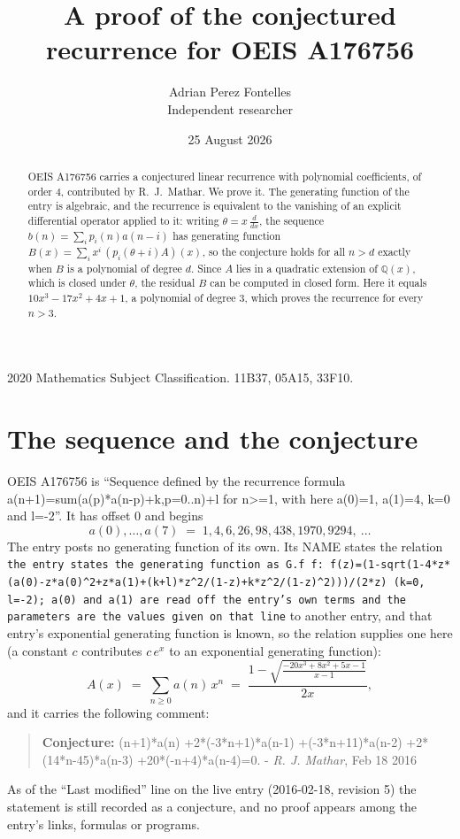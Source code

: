 \documentclass[11pt,a4paper]{article}
\title{A proof of the conjectured recurrence for OEIS A176756}
\author{Adrian Perez Fontelles\\ \small Independent researcher}
\date{25 August 2026}
\theoremstyle{plain}
\theoremstyle{definition}
\begin{document}
\maketitle

\begin{abstract}
OEIS A176756 carries a conjectured linear recurrence with polynomial coefficients, of
order 4, contributed by R.~J.~Mathar. We prove it. The generating function of the
entry is algebraic, and the recurrence is equivalent to the vanishing of an explicit
differential operator applied to it: writing $\theta=x\,\frac{d}{dx}$, the sequence
$b(n)=\sum_{i}p_{i}(n)a(n-i)$ has generating function
$B(x)=\sum_{i}x^{i}\,(p_{i}(\theta+i)A)(x)$, so the conjecture holds for all $n>d$ exactly
when $B$ is a polynomial of degree $d$. Since $A$ lies in a quadratic extension of
$\mathbb{Q}(x)$, which is closed under $\theta$, the residual $B$ can be computed in
closed form. Here it equals $10 x^{3} - 17 x^{2} + 4 x + 1$, a polynomial of degree $3$, which proves
the recurrence for every $n>3$.
\end{abstract}

\noindent\small 2020 Mathematics Subject Classification. 11B37, 05A15, 33F10.\normalsize

\section{The sequence and the conjecture}

OEIS A176756 is ``Sequence defined by the recurrence formula a(n+1)=sum(a(p)*a(n-p)+k,p=0..n)+l for n>=1, with here a(0)=1, a(1)=4, k=0 and l=-2''. It has offset $0$ and begins
\[
a(0),\dots,a(7)\;=\;1, 4, 6, 26, 98, 438, 1970, 9294,\ \dots
\]
The entry posts no generating function of its own. Its NAME states the
relation \texttt{the entry states the generating function as G.f f: f(z)=(1-sqrt(1-4*z*(a(0)-z*a(0)\textasciicircum{}2+z*a(1)+(k+l)*z\textasciicircum{}2/(1-z)+k*z\textasciicircum{}2/(1-z)\textasciicircum{}2)))/(2*z) (k=0, l=-2); a(0) and a(1) are read off the entry's own terms and the parameters are the values given on that line} to another entry, and that entry's exponential generating
function is known, so the relation supplies one here (a constant $c$ contributes
$c\,e^{x}$ to an exponential generating function):
\begin{equation}\label{eq:gf}
A(x)\;=\;\sum_{n\ge 0} a(n)\,x^{n}\;=\;\frac{1 - \sqrt{\frac{- 20 x^{3} + 8 x^{2} + 5 x - 1}{x - 1}}}{2 x} ,
\end{equation}
and it carries the following comment:
\begin{quote}\small
\textbf{Conjecture:} (n+1)*a(n) +2*(-3*n+1)*a(n-1) +(-3*n+11)*a(n-2) +2*(14*n-45)*a(n-3) +20*(-n+4)*a(n-4)=0. - \emph{R. J. Mathar}, Feb 18 2016
\end{quote}
As of the ``Last modified'' line on the live entry (2016-02-18, revision 5) the
statement is still recorded as a conjecture, and no proof appears among the entry's links,
formulas or programs.
\end{document}
